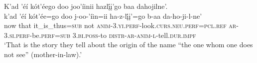 \ea\label{ex:text5-9-6}
K’ad ’éí kót’éego doo joo’íinii hazlį́į’go baa dahojilne’.\\
\gll k’ad	’éí	kót’ée=go	doo	j-oo-’íin=ii	ha-z-lį́į’=go	b-aa	da-ho-ji-l-ne’\\
     now	that	it\_is\_thus=\textsc{sub}	not	\textsc{anim}-3.\textsc{yi}.\textsc{perf}-look.\textsc{curs}.\textsc{neu}.\textsc{perf}=\textsc{pcl}.\textsc{ref}	\textsc{ar}-3.\textsc{si}.\textsc{perf}-be.\textsc{perf}=\textsc{sub}	3.\textsc{bi}.\textsc{poss}-to	\textsc{distr}-\textsc{ar}-\textsc{anim}-\textsc{l}-tell.\textsc{dur}.\textsc{impf}\\
\glt `That is the story they tell about the origin of the name ``the one whom one does not see'' (mother-in-law).'
\z
